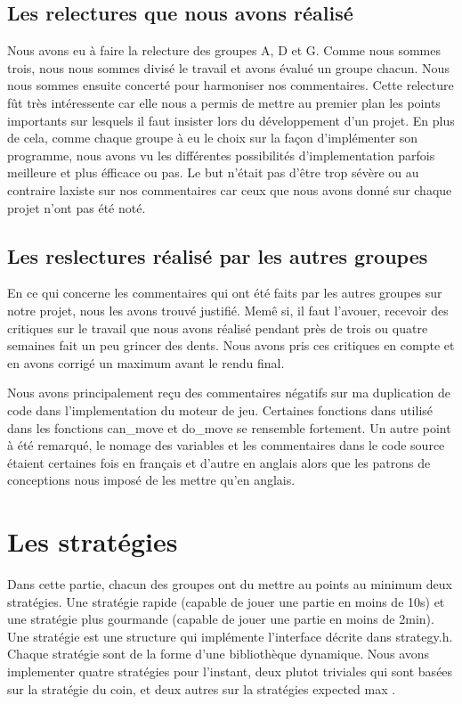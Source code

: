 \documentclass[12pt]{article}
\begin{document}
\subsection{Les relectures que nous avons r\'ealis\'e}
Nous avons eu \`a faire la relecture des groupes A, D et G. Comme nous sommes
trois, nous nous sommes divis\'e le travail et avons \'evalu\'e un groupe
chacun. Nous nous sommes ensuite concert\'e pour harmoniser nos commentaires.
Cette relecture f\^ut tr\`es int\'eressente car elle nous a permis de mettre au
premier plan les points importants sur lesquels il faut insister lors du
d\'eveloppement d'un projet. En plus de cela, comme chaque groupe à eu le choix
sur la façon d'impl\'ementer son programme, nous avons vu les diff\'erentes
possibilit\'es d'implementation parfois meilleure et plus \'efficace ou pas. Le
but n'\'etait pas d'\^etre trop s\'ev\`ere ou au contraire laxiste sur nos
commentaires car ceux que nous avons donn\'e sur chaque projet n'ont pas \'et\'e
not\'e.
\subsection{Les reslectures r\'ealis\'e par les autres groupes}
\label{notre_etude}
En ce qui concerne les commentaires qui ont \'et\'e faits par les autres groupes
sur notre projet, nous les avons trouv\'e justifi\'e. Mem\^e si, il faut
l'avouer, recevoir des \og critiques \fg{} sur le travail que nous avons
r\'ealis\'e pendant pr\`es de trois ou quatre semaines fait un peu grincer des
dents. Nous avons pris ces critiques en compte et en avons corrig\'e un
maximum avant le rendu final. 
\par Nous avons principalement reçu des commentaires n\'egatifs sur ma
duplication de code dans l'implementation du moteur de jeu. Certaines fonctions
dans utilis\'e dans les fonctions \og can\_move \fg{} et \og do\_move \fg{} se
rensemble fortement. Un autre point \`a \'et\'e remarqu\'e, le nomage des
variables et les commentaires dans le code source \'etaient certaines fois en
français et d'autre en anglais alors que les patrons de conceptions nous
impos\'e de les mettre qu'en anglais.

\newpage
\section{Les strat\'egies}
Dans cette partie, chacun des groupes ont du mettre au points au minimum deux
strat\'egies. Une strat\'egie rapide (capable de jouer une partie en moins de
10s) et une strat\'egie plus gourmande (capable de jouer une partie en moins de
2min). Une strat\'egie est une structure qui impl\'emente l’interface d\'ecrite
dans strategy.h. Chaque strat\'egie sont de la forme d’une biblioth\`eque
dynamique. Nous avons implementer quatre strat\'egies pour l'instant, deux
plutot triviales qui sont basées sur la strat\'egie du coin, et deux autres sur
la strat\'egies \og expected max \fg{}. 
\end{document}

